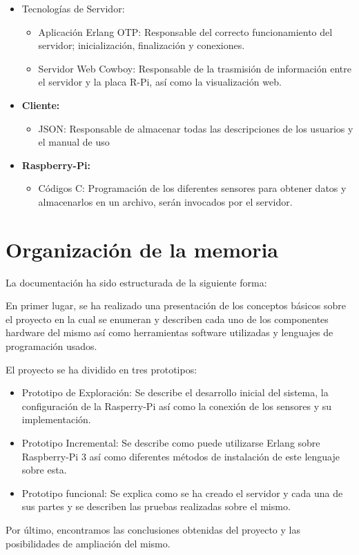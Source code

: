 \begin{itemize}
 \item Tecnologías de Servidor:
 \begin{itemize}
     \item Aplicación Erlang OTP: Responsable del correcto funcionamiento del servidor; inicialización, finalización y conexiones.
     \item Servidor Web Cowboy: Responsable de la trasmisión de información entre el servidor y la placa R-Pi, así como la visualización web.
 \end{itemize}
 
\item \textbf{Cliente:}
\begin{itemize}
    \item JSON: Responsable de almacenar todas las descripciones de los usuarios y el manual de uso
\end{itemize}

\item \textbf{Raspberry-Pi:}
\begin{itemize}
    \item Códigos C: Programación de los diferentes sensores para obtener datos y almacenarlos en un archivo, serán invocados por el servidor.
\end{itemize}
\end{itemize}


\section{Organización de la memoria}

La documentación ha sido estructurada de la siguiente forma:

En primer lugar, se ha realizado una presentación de los conceptos básicos sobre el proyecto en la cual se enumeran y describen cada uno de los componentes hardware del mismo así como herramientas software utilizadas y lenguajes de programación usados.

El proyecto se ha dividido en tres prototipos:
\begin{itemize}
    \item Prototipo de Exploración: Se describe el desarrollo inicial del sistema, la configuración de la Rasperry-Pi así como la conexión de los sensores y su implementación.
    \item Prototipo Incremental: Se describe como puede utilizarse Erlang sobre Raspberry-Pi 3 así como diferentes métodos de instalación de este lenguaje sobre esta.
    \item Prototipo funcional: Se explica como se ha creado el servidor y cada una de sus partes y se describen las pruebas realizadas sobre el mismo.
\end{itemize}

Por último, encontramos las conclusiones obtenidas del proyecto y las posibilidades de ampliación del mismo.

